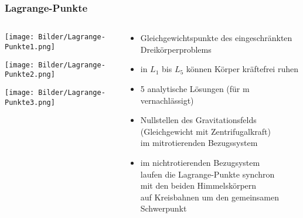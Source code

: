 \documentclass{beamer}
\begin{document}
\begin{frame}\frametitle{Lagrange-Punkte}

\begin{columns}

\begin{column}{.48\textwidth}

\texttt{[image: Bilder/Lagrange-Punkte1.png]}

\texttt{[image: Bilder/Lagrange-Punkte2.png]}

\texttt{[image: Bilder/Lagrange-Punkte3.png]}

\end{column}

\hfill

\begin{column}{.48\textwidth}

\begin{itemize}
\item Gleichgewichtspunkte des eingeschränkten Dreikörperproblems
\item in $L_1$ bis $L_5$ können Körper kräftefrei ruhen\\[.3cm]

\item 5 analytische Lösungen (für m vernachlässigt)

\tiny

\item Nullstellen des Gravitationsfelds\\ (Gleichgewicht mit Zentrifugalkraft)\\ im mitrotierenden Bezugssystem
\item im nichtrotierenden Bezugsystem\\ laufen die Lagrange-Punkte synchron\\ mit den beiden Himmelskörpern\\ auf Kreisbahnen um den gemeinsamen Schwerpunkt
\end{itemize}

\end{column}

\end{columns}

\end{frame}
\end{document}
